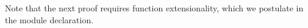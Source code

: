%
Note that the next proof requires function extensionality, which we postulate in the module declaration.
\ccpad
